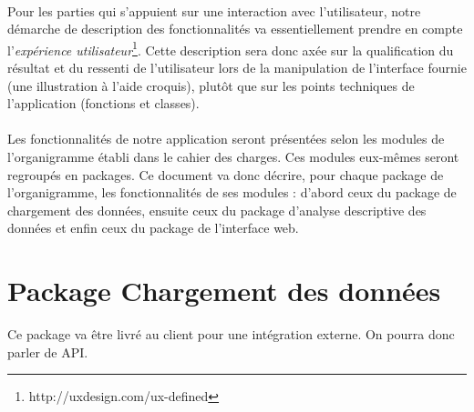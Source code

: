 		\paragraph{}Pour les parties qui s'appuient sur une interaction avec l'utilisateur, notre démarche de description des fonctionnalités va essentiellement prendre en compte l'\textit{expérience utilisateur}\footnote{http://uxdesign.com/ux-defined}. Cette description sera donc axée sur la qualification du résultat et du ressenti de l'utilisateur lors de la manipulation de l'interface fournie (une illustration à l'aide croquis), plutôt que sur les points techniques de l'application (fonctions et classes).
		\paragraph{}Les fonctionnalités de notre application seront présentées selon les modules de l'organigramme établi dans le cahier des charges. Ces modules eux-mêmes seront regroupés en packages. Ce document va donc décrire, pour chaque package de l'organigramme, les fonctionnalités de ses modules : d'abord ceux du package de chargement des données, ensuite ceux du package d'analyse descriptive des données et enfin ceux du package de l'interface web.
		
	\section{Package Chargement des données}
	Ce package va être livré au client pour une intégration externe. On pourra donc parler de API.
		
